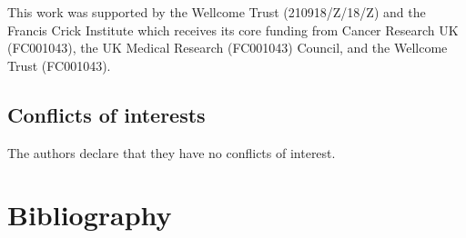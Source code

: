 This work was supported by the Wellcome Trust (210918/Z/18/Z) and the Francis Crick Institute which receives its core funding from Cancer Research UK (FC001043), the UK Medical Research (FC001043) Council, and the Wellcome Trust (FC001043).


\subsection*{Conflicts of interests}
The authors declare that they have no conflicts of interest.



\section*{Bibliography}



